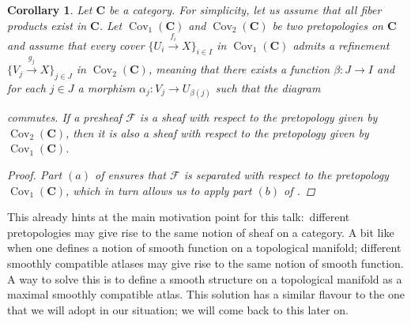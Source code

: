 \documentclass[12pt,reqno,a4paper]{amsart}
\theoremstyle{plain}
\newtheorem{cor}[thm]{Corollary}
\theoremstyle{definition}
\theoremstyle{remark}
\begin{document}
\begin{cor}\label{cor:refinement}
  Let $\mathbf{C}$ be a category.
  For simplicity, let us assume that all fiber products exist in $\mathbf{C}$.
  Let $\operatorname{Cov}_{1}(\mathbf{C})$ and $\operatorname{Cov}_{2}(\mathbf{C})$ be two pretopologies on $\mathbf{C}$ and assume that every cover $\{ U_{i} \xrightarrow{f_{i}} X \}_{i \in I}$ in $\operatorname{Cov}_{1}(\mathbf{C})$ admits a refinement $\{ V_{j} \xrightarrow{g_{j}} X \}_{j \in J}$ in $\operatorname{Cov}_{2}(\mathbf{C})$, meaning that there exists a function $\beta \colon J \to I$ and for each $j \in J$ a morphism $\alpha_{j} \colon V_{j} \to U_{\beta(j)}$ such that the diagram
  \begin{center}
  \end{center}
  commutes.
  If a presheaf $\mathscr{F}$ is a sheaf with respect to the pretopology given by $\operatorname{Cov}_{2}(\mathbf{C})$, then it is also a sheaf with respect to the pretopology given by $\operatorname{Cov}_{1}(\mathbf{C})$.
  \begin{proof}
    Part $(a)$ of  ensures that $\mathscr{F}$ is separated with respect to the pretopology $\operatorname{Cov}_{1}(\mathbf{C})$, which in turn allows us to apply part $(b)$ of .
  \end{proof}
\end{cor}

This already hints at the main motivation point for this talk:~different pretopologies may give rise to the same notion of sheaf on a category.
A bit like when one defines a notion of smooth function on a topological manifold; different smoothly compatible atlases may give rise to the same notion of smooth function.
A way to solve this is to define a smooth structure on a topological manifold as a maximal smoothly compatible atlas.
This solution has a similar flavour to the one that we will adopt in our situation; we will come back to this later on.
\end{document}
